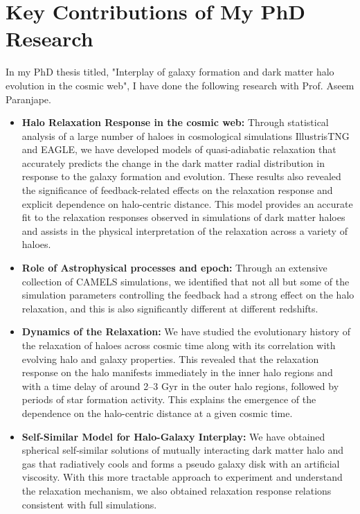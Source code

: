\documentclass[12pt]{article}
\begin{document}
\section{Key Contributions of My PhD Research}

In my PhD thesis titled, "Interplay of galaxy formation and dark matter halo evolution in the cosmic web", I have done the following research with Prof. Aseem Paranjape.

\begin{itemize}
    \item \textbf{Halo Relaxation Response in the cosmic web:} Through statistical analysis of a large number of haloes in cosmological simulations IllustrisTNG and EAGLE, we have developed models of quasi-adiabatic relaxation that accurately predicts the change in the dark matter radial distribution in response to the galaxy formation and evolution. These results also revealed the significance of feedback-related effects on the relaxation response and explicit dependence on halo-centric distance. This model provides an accurate fit to the relaxation responses observed in simulations of dark matter haloes and assists in the physical interpretation of the relaxation across a variety of haloes.
    
    \item \textbf{Role of Astrophysical processes and epoch:} Through an extensive collection of CAMELS simulations, we identified that not all but some of the simulation parameters controlling the feedback had a strong effect on the halo relaxation, and this is also significantly different at different redshifts.
    
    \item \textbf{Dynamics of the Relaxation:}  We have studied the evolutionary history of the relaxation of haloes across cosmic time along with its correlation with evolving halo and galaxy properties. This revealed that the relaxation response on the halo manifests immediately in the inner halo regions and with a time delay of around 2–3 Gyr in the outer halo regions, followed by periods of star formation activity. This explains the emergence of the dependence on the halo-centric distance at a given cosmic time.
    
    \item \textbf{Self-Similar Model for Halo-Galaxy Interplay:} We have obtained spherical self-similar solutions of mutually interacting dark matter halo and gas that radiatively cools and forms a pseudo galaxy disk with an artificial viscosity. With this more tractable approach to experiment and understand the relaxation mechanism, we also obtained relaxation response relations consistent with full simulations.
\end{itemize}
\end{document}
